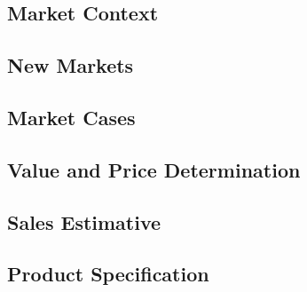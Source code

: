 \subsection{Market Context}
    

\subsection{New Markets}
    

\subsection{Market Cases}
    

\subsection{Value and Price Determination}
    

\subsection{Sales Estimative}
    

\subsection{Product Specification}
    